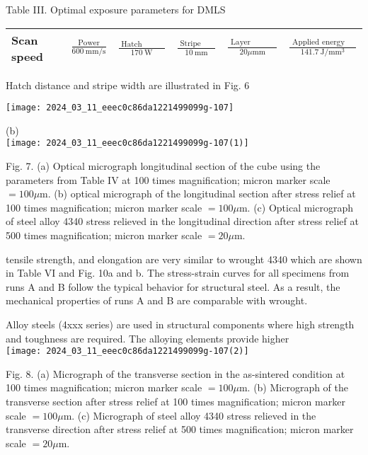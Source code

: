 \documentclass[10pt]{article}
\begin{document}
Table III. Optimal exposure parameters for DMLS

\begin{center}
\begin{tabular}{llllll}
\hline
Scan speed & $\frac{\text { Power }}{600 \mathrm{~mm} / \mathrm{s}}$ & $\frac{\text { Hatch distance }}{170 \mathrm{~W}}$ & $\frac{\text { Stripe width }}{10 \mathrm{~mm}}$ & $\frac{\text { Layer thickness }}{20 \mu \mathrm{mm}}$ & $\frac{\text { Applied energy density }}{141.7 \mathrm{~J} / \mathrm{mm}^{3}}$ \\
\hline
\end{tabular}
\end{center}

Hatch distance and stripe width are illustrated in Fig. 6

\begin{center}
\texttt{[image: 2024\_03\_11\_eeec0c86da1221499099g-107]}
\end{center}

(b)\\
\texttt{[image: 2024\_03\_11\_eeec0c86da1221499099g-107(1)]}

Fig. 7. (a) Optical micrograph longitudinal section of the cube using the parameters from Table IV at 100 times magnification; micron marker scale $=100 \mu \mathrm{m}$. (b) optical micrograph of the longitudinal section after stress relief at 100 times magnification; micron marker scale $=100 \mu \mathrm{m}$. (c) Optical micrograph of steel alloy 4340 stress relieved in the longitudinal direction after stress relief at 500 times magnification; micron marker scale $=20 \mu \mathrm{m}$.

tensile strength, and elongation are very similar to wrought 4340 which are shown in Table VI and Fig. 10a and b. The stress-strain curves for all specimens from runs A and B follow the typical behavior for structural steel. As a result, the mechanical properties of runs A and B are comparable with wrought.

Alloy steels (4xxx series) are used in structural components where high strength and toughness are required. The alloying elements provide higher\\
\texttt{[image: 2024\_03\_11\_eeec0c86da1221499099g-107(2)]}

Fig. 8. (a) Micrograph of the transverse section in the as-sintered condition at 100 times magnification; micron marker scale $=100 \mu \mathrm{m}$. (b) Micrograph of the transverse section after stress relief at 100 times magnification; micron marker scale $=100 \mu \mathrm{m}$. (c) Micrograph of steel alloy 4340 stress relieved in the transverse direction after stress relief at 500 times magnification; micron marker scale $=20 \mu \mathrm{m}$.
\end{document}
